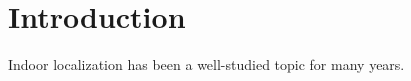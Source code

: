 \section{Introduction}
\label{sec:introduction}

Indoor localization has been a well-studied topic for many years.



